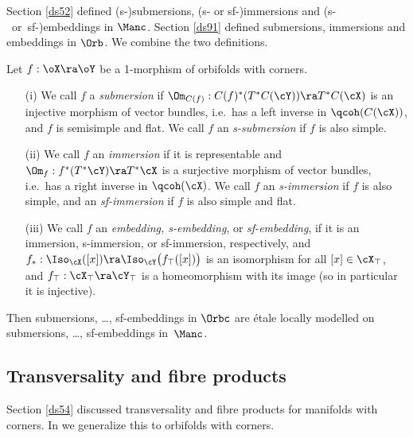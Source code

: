 \documentclass{article}
\begin{document}
Section \ref{ds52} defined (s-)submersions, (s- or sf-)immersions
and \hbox{(s- or sf-)}\ab embeddings in $\Manc$. Section \ref{ds91}
defined submersions, immersions and embeddings in $\Orb$. We combine
the two definitions.

\begin{dfn} Let $f:\oX\ra\oY$ be a 1-morphism of orbifolds with
corners.
\begin{itemize}
\setlength{\itemsep}{0pt}
\setlength{\parsep}{0pt}
\item[(i)] We call $f$ a {\it submersion\/} if $\Om_{C(f)}:C(f)^*(T^*C(\cY))\ra
T^*C(\cX)$ is an injective morphism of vector bundles, i.e.\ has
a left inverse in $\qcoh(C(\cX))$, and $f$ is semisimple and
flat. We call $f$ an {\it s-submersion\/} if $f$ is also simple.
\item[(ii)] We call $f$ an {\it immersion\/} if it is representable and
$\Om_f:f^*(T^*\cY)\ra T^*\cX$ is a surjective morphism of vector
bundles, i.e.\ has a right inverse in $\qcoh(\cX)$. We call $f$
an {\it s-immersion\/} if
$f$ is also simple, and an {\it sf-immersion\/} if $f$ is also simple and flat.
\item[(iii)] We call $f$ an {\it embedding, s-embedding}, or
{\it sf-embedding}, if it
is an immersion, s-immersion, or sf-immersion, respectively, and
$f_*:\Iso_\cX([x])\ra\Iso_\cY \bigl(f_\top([x])\bigr)$ is an
isomorphism for all $[x]\in\cX_\top$, and
$f_\top:\cX_\top\ra\cY_\top$ is a homeomorphism with its image
(so in particular it is injective).
\end{itemize}
\label{ds12def6}
\end{dfn}

Then submersions, \ldots, sf-embeddings in $\Orbc$ are \'etale
locally modelled on submersions, \ldots, sf-embeddings in~$\Manc$.

\subsection{Transversality and fibre products}
\label{ds124}

Section \ref{ds54} discussed transversality and fibre products for
manifolds with corners. In \cite[\S 8.8]{Joyc6} we generalize this
to orbifolds with corners.
\end{document}
